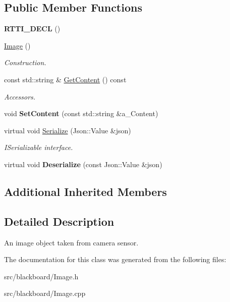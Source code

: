 \subsection*{Public Member Functions}
\begin{DoxyCompactItemize}
\item 
\mbox{\label{class_image_a0971cdf1a4e64ab0ccef3452151eb5c4}} 
{\bfseries R\+T\+T\+I\+\_\+\+D\+E\+CL} ()
\item 
\mbox{\label{class_image_a58edd1c45b4faeb5f789b0d036d02313}} 
\hyperlink{class_image_a58edd1c45b4faeb5f789b0d036d02313}{Image} ()
\begin{DoxyCompactList}\small\item\em Construction. \end{DoxyCompactList}\item 
\mbox{\label{class_image_aa9754d698c24f7f4d27716d08d973f61}} 
const std\+::string \& \hyperlink{class_image_aa9754d698c24f7f4d27716d08d973f61}{Get\+Content} () const
\begin{DoxyCompactList}\small\item\em Accessors. \end{DoxyCompactList}\item 
\mbox{\label{class_image_ae9538432309c8626ac03e1a7d4425eb4}} 
void {\bfseries Set\+Content} (const std\+::string \&a\+\_\+\+Content)
\item 
\mbox{\label{class_image_ab3ad88206f29548e6c6ff643a6059b80}} 
virtual void \hyperlink{class_image_ab3ad88206f29548e6c6ff643a6059b80}{Serialize} (Json\+::\+Value \&json)
\begin{DoxyCompactList}\small\item\em I\+Serializable interface. \end{DoxyCompactList}\item 
\mbox{\label{class_image_a880edf876477f740ef1a502b08fa164e}} 
virtual void {\bfseries Deserialize} (const Json\+::\+Value \&json)
\end{DoxyCompactItemize}
\subsection*{Additional Inherited Members}


\subsection{Detailed Description}
An image object taken from camera sensor. 

The documentation for this class was generated from the following files\+:\begin{DoxyCompactItemize}
\item 
src/blackboard/Image.\+h\item 
src/blackboard/Image.\+cpp\end{DoxyCompactItemize}
